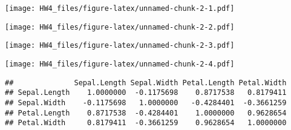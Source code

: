 \documentclass[
]{article}
\newenvironment{Shaded}{\begin{snugshade}}{\end{snugshade}}
\newcommand{\AttributeTok}[1]{\textcolor[rgb]{0.77,0.63,0.00}{#1}}
\newcommand{\CommentTok}[1]{\textcolor[rgb]{0.56,0.35,0.01}{\textit{#1}}}
\newcommand{\DecValTok}[1]{\textcolor[rgb]{0.00,0.00,0.81}{#1}}
\newcommand{\FunctionTok}[1]{\textcolor[rgb]{0.00,0.00,0.00}{#1}}
\newcommand{\NormalTok}[1]{#1}
\newcommand{\SpecialCharTok}[1]{\textcolor[rgb]{0.00,0.00,0.00}{#1}}
\newcommand{\StringTok}[1]{\textcolor[rgb]{0.31,0.60,0.02}{#1}}
\begin{document}
\texttt{[image: HW4\_files/figure-latex/unnamed-chunk-2-1.pdf]}

\begin{Shaded}
\end{Shaded}

\texttt{[image: HW4\_files/figure-latex/unnamed-chunk-2-2.pdf]}

\begin{Shaded}
\end{Shaded}

\texttt{[image: HW4\_files/figure-latex/unnamed-chunk-2-3.pdf]}

\begin{Shaded}
\end{Shaded}

\texttt{[image: HW4\_files/figure-latex/unnamed-chunk-2-4.pdf]}

\begin{Shaded}
\end{Shaded}

\begin{verbatim}
##              Sepal.Length Sepal.Width Petal.Length Petal.Width
## Sepal.Length    1.0000000  -0.1175698    0.8717538   0.8179411
## Sepal.Width    -0.1175698   1.0000000   -0.4284401  -0.3661259
## Petal.Length    0.8717538  -0.4284401    1.0000000   0.9628654
## Petal.Width     0.8179411  -0.3661259    0.9628654   1.0000000
\end{verbatim}
\end{document}
